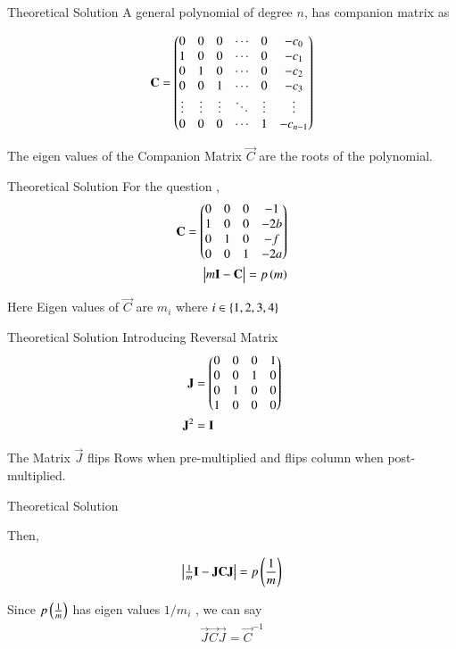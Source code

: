 \documentclass{beamer}
\begin{document}
\begin{frame}{Theoretical Solution}
A general polynomial of degree $n$, has companion matrix as

\begin{align}
   \mathbf{C} = \begin{pmatrix}0 & 0 & 0 & \cdots & 0 & -c_{0} \\
1 & 0 & 0 & \cdots & 0 & -c_{1} \\
0 & 1 & 0 & \cdots & 0 & -c_{2} \\
0 & 0 & 1 & \cdots & 0 & -c_{3} \\
\vdots & \vdots & \vdots & \ddots & \vdots & \vdots \\
0 & 0 & 0 & \cdots & 1 & -c_{n-1}\end{pmatrix}
\end{align}

The eigen values of the Companion Matrix $\vec{C}$ are the roots of the polynomial.
\end{frame}
\begin{frame}{Theoretical Solution}
For the question , 
\begin{align}
    \mathbf{C} = \begin{pmatrix}0&0&0&-1\\
                     1&0&0&-2b\\
                     0&1&0&-f\\
                     0&0&1&-2a\end{pmatrix}\\
    \begin{vmatrix}m\mathbf{I}-\mathbf{C}\end{vmatrix} = p\left(m\right)
\end{align}

Here Eigen values of $\vec{C}$ are $m_i$ where $i \in \left\{1,2,3,4\right\}$
\end{frame}

\begin{frame}{Theoretical Solution}
Introducing Reversal Matrix 
\begin{align}
    \mathbf{J} &= \begin{pmatrix}0&0&0&1\\0&0&1&0\\0&1&0&0\\1&0&0&0\end{pmatrix} \\ 
    \mathbf{J}^2 &= \mathbf{I} \label{eq_2}
\end{align}

The Matrix $\vec{J}$ flips Rows when pre-multiplied and flips column when post-multiplied.
\end{frame}

\begin{frame}{Theoretical Solution}

Then,

\begin{align}
  \begin{vmatrix}\frac{1}{m}\mathbf{I}-\mathbf{J}\mathbf{C}\mathbf{J}\end{vmatrix} = p\left(\frac{1}{m}\right)
\end{align}

Since $p\left(\frac{1}{m}\right)$ has eigen values $1/m_i$ , we can say 
\begin{align}
    \vec{J}\vec{C}\vec{J} = \vec{C}^{-1} \\
\end{align}
\end{frame}
\end{document}
